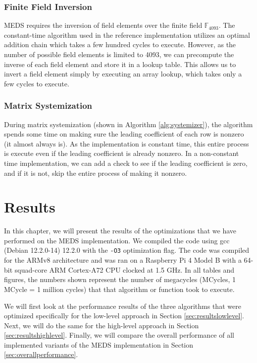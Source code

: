 \documentclass[11pt,a4paper]{report}
\theoremstyle{definition}
\begin{document}
\subsection{Finite Field Inversion}
MEDS requires the inversion of field elements over the finite field $\mathbb{F}_{4093}$. The constant-time algorithm used in the reference implementation utilizes an optimal addition chain which takes a few hundred cycles to execute. However, as the number of possible field elements is limited to 4093, we can precompute the inverse of each field element and store it in a lookup table. This allows us to invert a field element simply by executing an array lookup, which takes only a few cycles to execute.

\subsection{Matrix Systemization}
During matrix systemization (shown in Algorithm \ref{alg:systemizer}), the algorithm spends some time on making sure the leading coefficient of each row is nonzero (it almost always is). As the implementation is constant time, this entire process is execute even if the leading coefficient is already nonzero. In a non-constant time implementation, we can add a check to see if the leading coefficient is zero, and if it is not, skip the entire process of making it nonzero.

\chapter{Results}
\label{ch:results}
In this chapter, we will present the results of the optimizations that we have performed on the MEDS implementation. We compiled the code using gcc (Debian 12.2.0-14) 12.2.0 with the \texttt{-O3} optimization flag. The code was compiled for the ARMv8 architecture and was ran on a Raspberry Pi 4 Model B with a 64-bit squad-core ARM Cortex-A72 CPU clocked at 1.5 GHz. In all tables and figures, the numbers shown represent the number of megacycles (MCycles, 1 MCycle = 1 million cycles) that that algorithm or function took to execute.

We will first look at the performance results of the three algorithms that were optimized specifically for the low-level approach in Section \ref{sec:resultslowlevel}. Next, we will do the same for the high-level approach in Section \ref{sec:resultshighlevel}. Finally, we will compare the overall performance of all implemented variants of the MEDS implementation in Section \ref{sec:overallperformance}.
\end{document}
